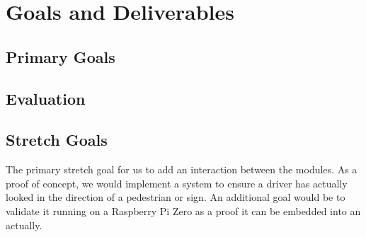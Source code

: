 \section{Goals and Deliverables}

\subsection{Primary Goals}

\subsection{Evaluation}

\subsection{Stretch Goals}

The primary stretch goal for us to add an interaction between the modules.
As a proof of concept, we would implement a system to ensure a driver has actually looked in the direction of a pedestrian or sign.
An additional goal would be to validate it running on a Raspberry Pi Zero as a proof it can be embedded into an actually.